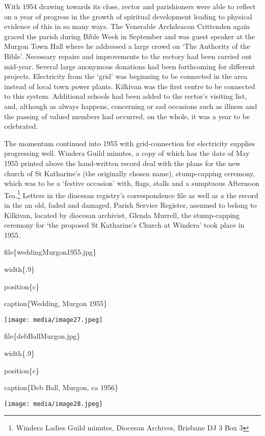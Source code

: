 With 1954 drawing towards its close, rector and parishioners were able to reflect on a year of progress in the growth of spiritual development leading to physical evidence of this in so many ways. The Venerable Archdeacon Crittenden again graced the parish during Bible Week in September and was guest speaker at the Murgon Town Hall where he addressed a large crowd on `The Authority of the Bible'. Necessary repairs and improvements to the rectory had been carried out mid-year. Several large anonymous donations had been forthcoming for different projects. Electricity from the `grid' was beginning to be connected in the area instead of local town power plants. Kilkivan was the first centre to be connected to this system. Additional schools had been added to the rector's visiting list, and, although as always happens, concerning or sad occasions such as illness and the passing of valued members had occurred, on the whole, it was a year to be celebrated.

The momentum continued into 1955 with grid-connection for electricity supplies progressing well. Windera Guild minutes, a copy of which has the date of May 1955 printed above the hand-written record deal with the plans for the new church of St Katharine's (the originally chosen name), stump-capping ceremony, which was to be a `festive occasion' with, flags, stalls and a sumptuous Afternoon Tea.\footnote{Windera Ladies Guild minutes, Diocesan Archives, Brisbane DJ 3 Box 3} Letters in the diocesan registry's correspondence file as well as a the record in the an old, faded and damaged, Parish Service Register, assumed to belong to Kilkivan, located by diocesan archivist, Glenda Murrell, the stump-capping ceremony for `the proposed St Katharine's Church at Windera' took place in 1955.

file\{weddingMurgon1955.jpg\}

width\{.9\}

position\{c\}

caption\{Wedding, Murgon 1955\}

\texttt{[image: media/image27.jpeg]}

file\{debBallMurgon.jpg\}

width\{.9\}

position\{c\}

caption\{Deb Ball, Murgon, ca 1956\}

\texttt{[image: media/image28.jpeg]}

